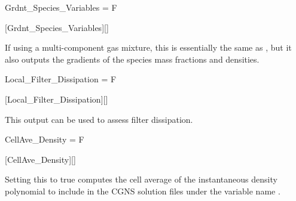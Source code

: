 
\begin{nmldescitem}
Grdnt_Species_Variables = F
\end{nmldescitem}
[Grdnt\_Species\_Variables][]

\begin{nmldescbody}
If using a multi-component gas mixture, this is essentially the same as
, but it also outputs
the gradients of the species mass fractions and densities.
\end{nmldescbody}



\begin{nmldescitem}
Local_Filter_Dissipation = F
\end{nmldescitem}
[Local\_Filter\_Dissipation][]

\begin{nmldescbody}
This output can be used to assess filter dissipation.
\end{nmldescbody}


\begin{nmldescitem}
CellAve_Density = F
\end{nmldescitem}
[CellAve\_Density][]

\begin{nmldescbody}
Setting this to true computes the cell average of the instantaneous density
polynomial to include in the CGNS solution files under the variable name
.
\end{nmldescbody}


